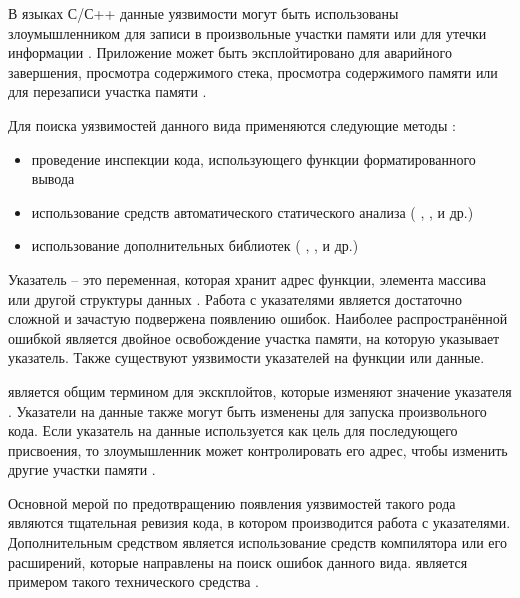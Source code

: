 %
В языках С/С++ данные уязвимости могут быть использованы злоумышленником для записи в произвольные 
участки памяти или для утечки информации . 
%
Приложение может быть эксплойтировано для аварийного завершения, просмотра содержимого стека, 
просмотра содержимого памяти или для перезаписи участка памяти  
 . 

%
Для поиска уязвимостей данного вида применяются следующие методы  
: 
\begin{itemize}
	\item проведение инспекции кода, использующего функции форматированного вывода 
	\item использование средств автоматического статического анализа ( , 
		 ,   и др.) 
	\item использование дополнительных библиотек ( , 
		 ,   и др.) 
\end{itemize}


%
Указатель -- это переменная, которая хранит адрес функции, элемента массива или другой структуры 
данных . 
%
Работа с указателями является достаточно сложной и зачастую подвержена появлению ошибок. 
%
Наиболее распространённой ошибкой является двойное освобождение участка памяти, на которую 
указывает указатель. 
%
Также существуют уязвимости указателей на функции или данные.

%
 является общим термином для экскплойтов, которые 
изменяют значение указателя . 
%
Указатели на данные также могут быть изменены для запуска произвольного кода. 
%
Если указатель на данные используется как цель для последующего присвоения, то злоумышленник может 
контролировать его адрес, чтобы изменить другие участки памяти . 

%
Основной мерой по предотвращению появления уязвимостей такого рода являются тщательная ревизия кода, 
в котором производится работа с указателями. 
%
Дополнительным средством является использование средств компилятора или его расширений, которые 
направлены на поиск ошибок данного вида. 
%
 является примером такого технического средства . 

